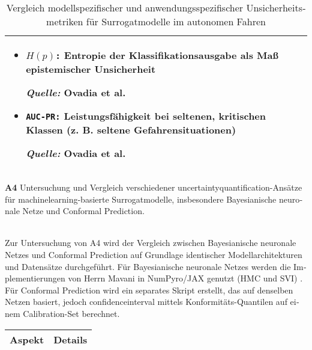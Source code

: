 \begin{otherlanguage}{ngerman}
\begin{table}[!htpb]
\begin{tabularx}{\textwidth}{|>{\centering\arraybackslash}l|X|X|}
\begin{itemize}[topsep=0em, itemsep=0.125em, leftmargin=*, label={}]
			\item \texttt{$H(p)$:} Entropie der Klassifikationsausgabe als Maß epistemischer Unsicherheit \par
			\begin{scriptsize}\textit{Quelle:} Ovadia et al. \parencite{ovadia2019can}\end{scriptsize}
			
			\item \texttt{AUC-PR:} Leistungsfähigkeit bei seltenen, kritischen Klassen (z. B. seltene Gefahrensituationen) \par
			\begin{scriptsize}\textit{Quelle:} Ovadia et al. \parencite{ovadia2019can}\end{scriptsize}
		\end{itemize}
		\\
		\hline
		
	\end{tabularx}
	\caption{Vergleich modellspezifischer und anwendungsspezifischer Unsicherheitsmetriken für Surrogatmodelle im autonomen Fahren}
	\label{tab:chapter6r71}
\end{table}



\pagebreak


\textbf{A4} Untersuchung und Vergleich verschiedener \gls{uncertaintyquantification}-Ansätze für \gls{machinelearning}-basierte Surrogatmodelle, insbesondere \gls{Bayesianische neuronale Netze} und \gls{Conformal Prediction}.
\par\noindent\\

Zur Untersuchung von A4 wird der Vergleich zwischen \gls{Bayesianische neuronale Netze}s und \gls{Conformal Prediction} auf Grundlage identischer Modellarchitekturen und Datensätze durchgeführt. Für \gls{Bayesianische neuronale Netze}s werden die Implementierungen von Herrn Mavani in NumPyro/JAX genutzt (HMC und SVI) \parencite{nmavani2025}. Für \gls{Conformal Prediction} wird ein separates Skript erstellt, das auf denselben Netzen basiert, jedoch \gls{confidenceinterval} mittels Konformitäts-Quantilen auf einem Calibration-Set berechnet.

\begin{table}[htbp]
  \centering
  \footnotesize
  \begin{tabularx}{\textwidth}{|l|X|}
  \hline
  \textbf{Aspekt} & \hspace{0.6em}\textbf{Details} \\ \hline


\end{tabularx}
\end{table}
\end{otherlanguage}
